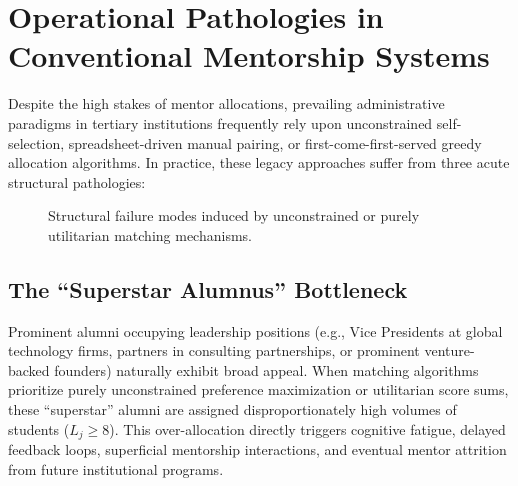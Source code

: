 \section{Operational Pathologies in Conventional Mentorship Systems}
Despite the high stakes of mentor allocations, prevailing administrative paradigms in tertiary institutions frequently rely upon unconstrained self-selection, spreadsheet-driven manual pairing, or first-come-first-served greedy allocation algorithms. In practice, these legacy approaches suffer from three acute structural pathologies:

\begin{figure}[htbp]
    \centering
    \caption{Structural failure modes induced by unconstrained or purely utilitarian matching mechanisms.}
    \label{fig:pathologies}
\end{figure}

\subsection{The ``Superstar Alumnus'' Bottleneck}
Prominent alumni occupying leadership positions (e.g., Vice Presidents at global technology firms, partners in consulting partnerships, or prominent venture-backed founders) naturally exhibit broad appeal. When matching algorithms prioritize purely unconstrained preference maximization or utilitarian score sums, these ``superstar'' alumni are assigned disproportionately high volumes of students ($L_j \ge 8$). This over-allocation directly triggers cognitive fatigue, delayed feedback loops, superficial mentorship interactions, and eventual mentor attrition from future institutional programs.

